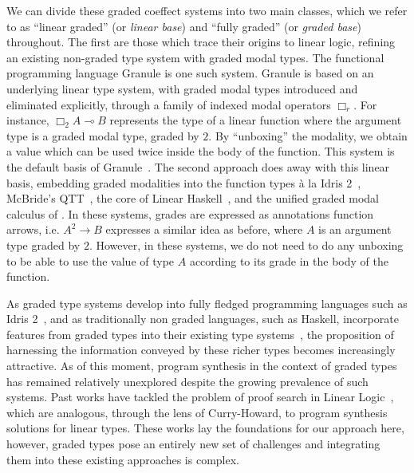 We can divide these graded coeffect systems into two main classes, which we
refer to as ``linear graded'' (or \emph{linear base}) and ``fully graded'' (or
\emph{graded base}) throughout. The first are those which trace their origins to
linear logic, refining an existing non-graded type system with graded modal
types. The functional programming language Granule is one such system. Granule
is based on an underlying linear type system, with graded modal types introduced
and eliminated explicitly, through a family of indexed modal operators $\Box_r$.
For instance, $\Box_2 A \multimap B$ represents the type of a linear function
where the argument type is a graded modal type, graded by $2$. By ``unboxing''
the modality, we obtain a value which can be used twice inside the body of the
function. This system is the default basis of
Granule~\citep{DBLP:journals/pacmpl/OrchardLE19}. The second approach does away
with this linear basis, embedding graded modalities into the function types à la
Idris 2~\citep{DBLP:journals/corr/abs-2104-00480}, McBride's
QTT~\citep{McBride2016,quantitative-type-theory}, the core of Linear
Haskell~\citep{DBLP:journals/pacmpl/BernardyBNJS18}, and the unified graded
modal calculus of \citep{DBLP:journals/pacmpl/AbelB20}. In these systems, grades
are expressed as annotations function arrows, i.e. $A^2 \rightarrow B$ expresses
a similar idea as before, where $A$ is an argument type graded by $2$. However,
in these systems, we do not need to do any unboxing to be able to use the value
of type $A$ according to its grade in the body of the function.

As graded type systems develop into fully fledged programming languages such as
Idris 2~\citep{DBLP:journals/corr/abs-2104-00480}, and as traditionally non
graded languages, such as Haskell, incorporate features from graded types into
their existing type systems~\citep{DBLP:journals/pacmpl/BernardyBNJS18}, the
proposition of harnessing the information conveyed by these richer types becomes
increasingly attractive. As of this moment, program synthesis in the context of
graded types has remained relatively unexplored despite the growing prevalence
of such systems. Past works have tackled the problem of proof search in Linear
Logic~\citep{HODAS1994327, CERVESATO2000133}, which are analogous, through the
lens of Curry-Howard, to program synthesis solutions for linear types. These
works lay the foundations for our approach here, however, graded types
pose an entirely new set of challenges and integrating them into these existing
approaches is complex.


